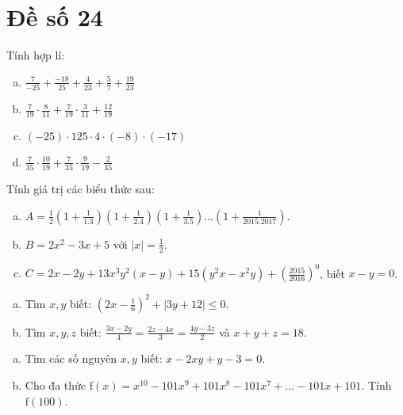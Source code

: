 \onehalfspacing
\section{Đề số 24}

\begin{bt} 
    Tính hợp lí:
   \begin{enumerate}[a.]
    \item $\frac{7}{-25}+\frac{-18}{25}+\frac{4}{23}+\frac{5}{7}+\frac{19}{23}$
    \item $\frac{7}{19} \cdot \frac{8}{11}+\frac{7}{19} \cdot \frac{3}{11}+\frac{12}{19}$
    \item $(-25) \cdot 125 \cdot 4 \cdot(-8) \cdot(-17)$ 
    \item $\frac{7}{35} \cdot \frac{10}{19}+\frac{7}{35} \cdot \frac{9}{19}-\frac{2}{35}$
   \end{enumerate}
\loigiai{}
\end{bt}

\begin{bt}
    Tính giá trị các biểu thức sau:
	\begin{enumerate}[a.]
        \item $A=\frac{1}{2}\left(1+\frac{1}{1.3}\right)\left(1+\frac{1}{2.4}\right)\left(1+\frac{1}{3.5}\right) ... \left(1+\frac{1}{2015.2017}\right)$.
        \item $B=2 x^2-3 x+5$ với $|x|=\frac{1}{2}$.
        \item $C=2 x-2 y+13 x^3 y^2(x-y)+15\left(y^2 x-x^2 y\right)+\left(\frac{2015}{2016}\right)^0$, biết $x-y=0$.
    \end{enumerate}
	\loigiai{} 
\end{bt}

\begin{bt}
    \hfill
    \begin{enumerate}[a.]
        \item Tìm $x, y$ biết: $\left(2 x-\frac{1}{6}\right)^2+|3 y+12| \leq 0$.
        \item Tìm $x, y, z$ biết: $\frac{3 x-2 y}{4}=\frac{2 z-4 x}{3}=\frac{4 y-3 z}{2}$ và $x+y+z=18$.
    \end{enumerate}
	\loigiai{}
\end{bt}

\begin{bt}
    \hfill
    \begin{enumerate}[a.]
        \item Tìm các số nguyên $x, y$ biết: $x-2 x y+y-3=0$.
        \item Cho đa thức $\mathrm{f}(x)=x^{10}-101 x^9+101 x^8-101 x^7+\ldots-101 x+101$. Tính $\mathrm{f}(100)$.
    \end{enumerate}
	\loigiai{}
\end{bt}

